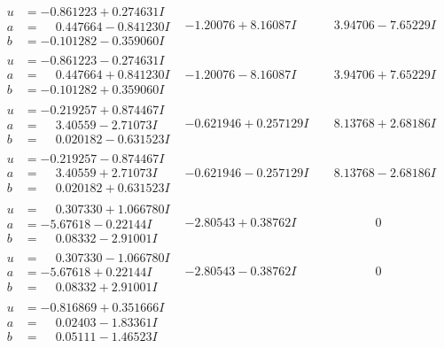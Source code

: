 \documentclass[1p]{elsarticle_modified}
\theoremstyle{definition}
\begin{document}
$$\begin{array}{c|c|c}
\begin{aligned}
u &= -0.861223 + 0.274631 I \\
a &= \phantom{-}0.447664 - 0.841230 I \\
b &= -0.101282 - 0.359060 I\end{aligned}
 & -1.20076 + 8.16087 I & \phantom{-}3.94706 - 7.65229 I \\ \hline\begin{aligned}
u &= -0.861223 - 0.274631 I \\
a &= \phantom{-}0.447664 + 0.841230 I \\
b &= -0.101282 + 0.359060 I\end{aligned}
 & -1.20076 - 8.16087 I & \phantom{-}3.94706 + 7.65229 I \\ \hline\begin{aligned}
u &= -0.219257 + 0.874467 I \\
a &= \phantom{-}3.40559 - 2.71073 I \\
b &= \phantom{-}0.020182 - 0.631523 I\end{aligned}
 & -0.621946 + 0.257129 I & \phantom{-}8.13768 + 2.68186 I \\ \hline\begin{aligned}
u &= -0.219257 - 0.874467 I \\
a &= \phantom{-}3.40559 + 2.71073 I \\
b &= \phantom{-}0.020182 + 0.631523 I\end{aligned}
 & -0.621946 - 0.257129 I & \phantom{-}8.13768 - 2.68186 I \\ \hline\begin{aligned}
u &= \phantom{-}0.307330 + 1.066780 I \\
a &= -5.67618 - 0.22144 I \\
b &= \phantom{-}0.08332 - 2.91001 I\end{aligned}
 & -2.80543 + 0.38762 I & \phantom{-0.000000 } 0 \\ \hline\begin{aligned}
u &= \phantom{-}0.307330 - 1.066780 I \\
a &= -5.67618 + 0.22144 I \\
b &= \phantom{-}0.08332 + 2.91001 I\end{aligned}
 & -2.80543 - 0.38762 I & \phantom{-0.000000 } 0 \\ \hline\begin{aligned}
u &= -0.816869 + 0.351666 I \\
a &= \phantom{-}0.02403 - 1.83361 I \\
b &= \phantom{-}0.05111 - 1.46523 I\end{aligned}

\end{array}$$
\end{document}
